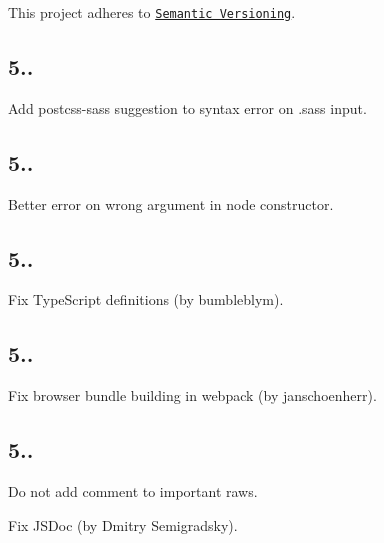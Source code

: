 This project adheres to \href{http://semver.org/}{\tt Semantic Versioning}.

\subsection*{5..}


\begin{DoxyItemize}
\item Add {\ttfamily postcss-\/sass} suggestion to syntax error on {\ttfamily .sass} input.
\end{DoxyItemize}

\subsection*{5..}


\begin{DoxyItemize}
\item Better error on wrong argument in node constructor.
\end{DoxyItemize}

\subsection*{5..}


\begin{DoxyItemize}
\item Fix Type\+Script definitions (by bumbleblym).
\end{DoxyItemize}

\subsection*{5..}


\begin{DoxyItemize}
\item Fix browser bundle building in webpack (by janschoenherr).
\end{DoxyItemize}

\subsection*{5..}


\begin{DoxyItemize}
\item Do not add comment to important raws.
\item Fix J\+S\+Doc (by Dmitry Semigradsky).
\end{DoxyItemize}


